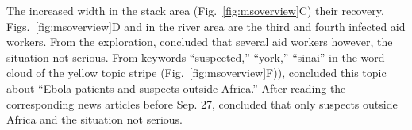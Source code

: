 The increased width in the stack area (Fig.~\ref{fig:msoverview}C)  their recovery.
Figs.~\ref{fig:msoverview}D and  in the river area are  the third and fourth infected aid workers.
From the  exploration,  concluded that several aid workers  however, the situation  not serious.
From keywords ``suspected,'' ``york,''  ``sinai'' in the word cloud of the yellow topic stripe (Fig.~\ref{fig:msoverview}F)),  
 concluded  this topic  about ``Ebola patients and suspects outside Africa.''
After reading the corresponding news articles before Sep. 27,  concluded that only  suspects  outside Africa and the situation  not serious.

